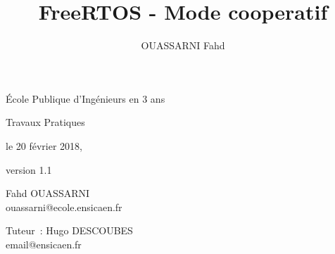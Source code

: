 \documentclass[a4paper]{report}
\begin{document}
\title{FreeRTOS - Mode cooperatif}
\author{OUASSARNI Fahd}

\makeatletter
{}
\begin{titlepage}
    \begin{center}
        \huge\color{ensigray}École Publique d'Ingénieurs en 3 ans
    \end{center}
    \vspace{1.2in}
    \begin{center}
        \LARGE Travaux Pratiques
    \end{center}
    \vspace{0.5cm}
    \begin{minipage}{1\linewidth}
        \centering
        {\Huge  \MakeUppercase{\@title}}
    \end{minipage}
    \vspace{1.2in}
    \begin{center}\large
        le 20 février 2018,

        version 1.1
    \end{center}
    \vspace{2em}

    \noindent\begin{minipage}[t]{0.47\linewidth}
      \begin{flushright}
        \large
        Fahd OUASSARNI\\
        {\color{ensiblue}ouassarni@ecole.ensicaen.fr}
      \end{flushright}
    \end{minipage}\hfill\vrule\hfill
    \begin{minipage}[t]{0.47\linewidth}
      \large
      Tuteur~: Hugo DESCOUBES\\
      {\color{ensiblue}email@ensicaen.fr}
    \end{minipage}
    \vfill


\end{titlepage}
\end{document}
